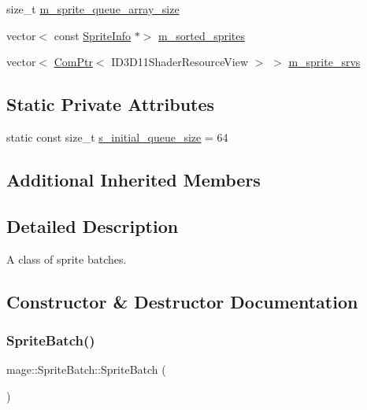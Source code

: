 \begin{DoxyCompactItemize}
\item 
size\+\_\+t \hyperlink{classmage_1_1_sprite_batch_a207760f2e11b1ea199529c65c9b21b3b}{m\+\_\+sprite\+\_\+queue\+\_\+array\+\_\+size}
\item 
vector$<$ const \hyperlink{structmage_1_1_sprite_info}{Sprite\+Info} $\ast$$>$ \hyperlink{classmage_1_1_sprite_batch_a65ad09d31c928ab1522d8b2c0c509b9a}{m\+\_\+sorted\+\_\+sprites}
\item 
vector$<$ \hyperlink{namespacemage_ae74f374780900893caa5555d1031fd79}{Com\+Ptr}$<$ I\+D3\+D11\+Shader\+Resource\+View $>$ $>$ \hyperlink{classmage_1_1_sprite_batch_adaad3bca737877db16bfa781563d8a93}{m\+\_\+sprite\+\_\+srvs}
\end{DoxyCompactItemize}
\subsection*{Static Private Attributes}
\begin{DoxyCompactItemize}
\item 
static const size\+\_\+t \hyperlink{classmage_1_1_sprite_batch_af649a6e9655bb8088d4c5d1e31281927}{s\+\_\+initial\+\_\+queue\+\_\+size} = 64
\end{DoxyCompactItemize}
\subsection*{Additional Inherited Members}


\subsection{Detailed Description}
A class of sprite batches. 

\subsection{Constructor \& Destructor Documentation}
\hypertarget{classmage_1_1_sprite_batch_a75924326627c792ff454d9d2a2ba1fda}{}\label{classmage_1_1_sprite_batch_a75924326627c792ff454d9d2a2ba1fda} 
\subsubsection{\texorpdfstring{Sprite\+Batch()}{SpriteBatch()}\hspace{0.1cm}{\footnotesize\ttfamily [1/4]}}
{\footnotesize\ttfamily mage\+::\+Sprite\+Batch\+::\+Sprite\+Batch (\begin{DoxyParamCaption}{ }\end{DoxyParamCaption})}

